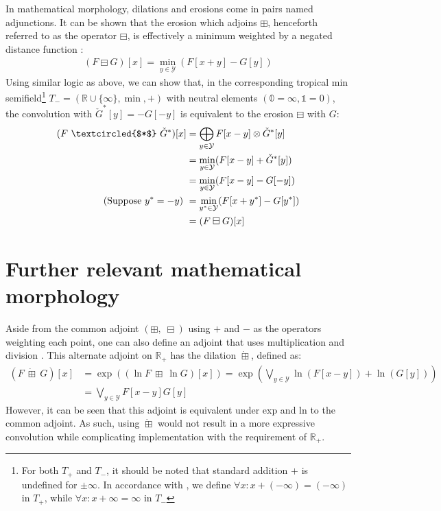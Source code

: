 \documentclass[a4paper, 12pt]{report}
\begin{document}
In mathematical morphology, dilations and erosions come in pairs named adjunctions. It can be shown that the erosion which adjoins $\boxplus$, henceforth referred to as the operator $\boxminus$, is effectively a minimum weighted by a negated distance function \cite{heijmans1996morphological}: 
\begin{align}
	(F \boxminus G)[x]=\min_{y\in \mathcal{Y}}(F[x+y] - G[y])
\end{align}
\noindent
Using similar logic as above, we can show that, in the corresponding tropical min semifield\footnote{For both $T_+$ and $T_-$, it should be noted that standard addition $+$ is undefined for $\pm\infty$. In accordance with \cite{maragos}, we define $\forall x: x+(-\infty)=(-\infty)$ in $T_+$, while $\forall x: x+\infty=\infty$ in $T_-$} $T_-=(\mathbb{R}\cup\{\infty\},\min,+)$ \cite{maragos} with neutral elements $(\mathbb{0}=\infty, \mathbb{1}=0)$, the convolution with $\check{G}^*[y]=-G[-y]$ is equivalent to the erosion $\boxminus$ with $G$:
\begin{align}
	(F ~\textcircled{$*$}~ \check{G}^*)[x]
	&= \bigoplus_{y\in \mathcal{Y}}F[x-y] \otimes \check{G}^*[y] \\
	&= \min_{y\in \mathcal{Y}}(F[x-y] + \check{G}^*[y]) \\
	&= \min_{y\in \mathcal{Y}}(F[x-y] - G[-y]) \\
	\textrm{(Suppose $y^*=-y)$  }&= \min_{y^*\in \mathcal{Y}}(F[x+y^*] - G[y^*]) \\
	&= (F \boxminus G)[x]
\end{align}

\section{Further relevant mathematical morphology}
\label{sec:closing}
Aside from the common adjoint $(\boxplus,\; \boxminus)$ using $+$ and $-$ as the operators weighting each point, one can also define an adjoint that uses multiplication and division \cite{heijmans1996morphological}. This alternate adjoint on $\mathbb{R}_+$ has the dilation $\dot \boxplus$, defined as:
\begin{align}
	(F~ \dot\boxplus~ G)[x] &= \exp((\ln F~ \boxplus~ \ln G)[x])
	= \exp(\bigvee_{y\in \mathcal{Y}}\ln(F[x-y])+\ln(G[y])) \nonumber \\
	&= \bigvee_{y\in \mathcal{Y}}F[x-y]G[y]
\end{align}
However, it can be seen that this adjoint is equivalent under exp and ln to the common adjoint. As such, using $\dot \boxplus$ would not result in a more expressive convolution while complicating implementation with the requirement of $\mathbb{R}_+$.
\end{document}
